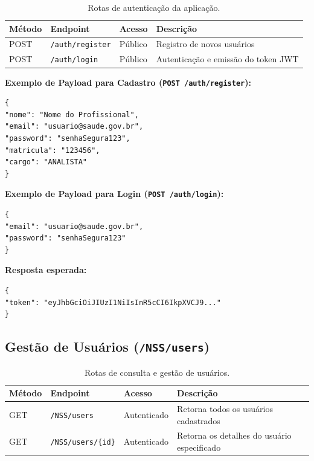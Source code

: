 \documentclass[12pt,a4paper]{article}
\begin{document}
\begin{table}[h]
\centering
\begin{tabular}{@{}llll@{}}
\toprule
\textbf{Método} & \textbf{Endpoint} & \textbf{Acesso} & \textbf{Descrição} \\ \midrule
POST & \texttt{/auth/register} & Público & Registro de novos usuários \\
POST & \texttt{/auth/login} & Público & Autenticação e emissão do token JWT \\ \bottomrule
\end{tabular}
\caption{Rotas de autenticação da aplicação.}
\end{table}

\noindent \textbf{Exemplo de Payload para Cadastro (\texttt{POST /auth/register}):}
\begin{lstlisting}
{
"nome": "Nome do Profissional",
"email": "usuario@saude.gov.br",
"password": "senhaSegura123",
"matricula": "123456",
"cargo": "ANALISTA"
}
\end{lstlisting}

\noindent \textbf{Exemplo de Payload para Login (\texttt{POST /auth/login}):}
\begin{lstlisting}
{
"email": "usuario@saude.gov.br",
"password": "senhaSegura123"
}
\end{lstlisting}

\noindent \textbf{Resposta esperada:}
\begin{lstlisting}
{
"token": "eyJhbGciOiJIUzI1NiIsInR5cCI6IkpXVCJ9..."
}
\end{lstlisting}

\subsection{Gestão de Usuários (\texttt{/NSS/users})}

\begin{table}[h]
\centering
\begin{tabular}{@{}llll@{}}
\toprule
\textbf{Método} & \textbf{Endpoint} & \textbf{Acesso} & \textbf{Descrição} \\ \midrule
GET & \texttt{/NSS/users} & Autenticado & Retorna todos os usuários cadastrados \\
GET & \texttt{/NSS/users/\{id\}} & Autenticado & Retorna os detalhes do usuário especificado \\ \bottomrule
\end{tabular}
\caption{Rotas de consulta e gestão de usuários.}
\end{table}
\end{document}
